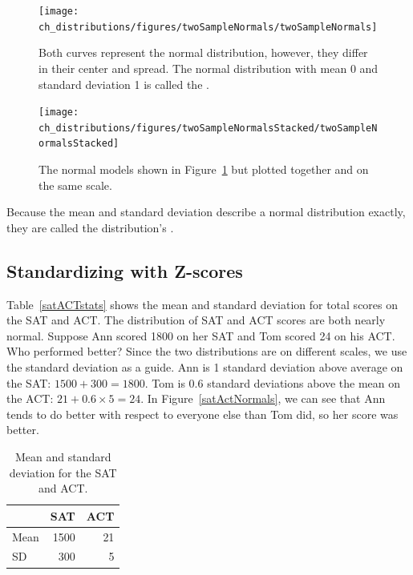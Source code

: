 \begin{figure}[hht]
\centering
\texttt{[image: ch\_distributions/figures/twoSampleNormals/twoSampleNormals]}
\caption{Both curves represent the normal distribution, however, they differ in their center and spread. The normal distribution with mean 0 and standard deviation 1 is called the .}
\label{twoSampleNormals}
\end{figure}

\begin{figure}[hht]
\centering
\texttt{[image: ch\_distributions/figures/twoSampleNormalsStacked/twoSampleNormalsStacked]}
\caption{The normal models shown in Figure~\ref{twoSampleNormals} but plotted together and on the same scale.}
\label{twoSampleNormalsStacked}
\end{figure}

Because the mean and standard deviation describe a normal distribution exactly, they are called the distribution's .


\textA{\newpage}

\subsection{Standardizing with Z-scores}

\begin{example}{Table~\vref{satACTstats} shows the mean and standard deviation for total scores on the SAT and ACT. The distribution of SAT and ACT scores are both nearly normal. Suppose Ann scored 1800 on her SAT and Tom scored 24 on his ACT. Who performed better?}\label{actSAT}
Since the two distributions are on different scales, we use the standard deviation as a guide. Ann is 1 standard deviation above average on the SAT: $1500 + 300=1800$. Tom is 0.6 standard deviations above the mean on the ACT: $21+0.6\times 5=24$. In Figure~\ref{satActNormals}, we can see that Ann tends to do better with respect to everyone else than Tom did, so her score was better.
\end{example}

\begin{table}
\centering
\begin{tabular}{l r r}
  \hline
  & SAT & ACT \\
  \hline
Mean \hspace{0.3cm} & 1500 & 21 \\
SD & 300 & 5 \\
   \hline
\end{tabular}
\caption{Mean and standard deviation for the SAT and ACT.}
\label{satACTstats}
\end{table}

